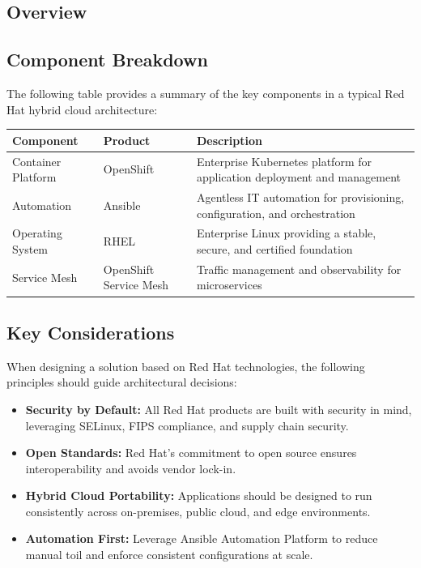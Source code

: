 \documentclass[11pt,a4paper]{article}
\begin{document}
\subsection{Overview}

\lipsum[1]

\subsection{Component Breakdown}

The following table provides a summary of the key components in a typical Red Hat hybrid cloud architecture:

\begin{center}
\begin{tabularx}{\textwidth}{llX}
    \toprule
    \textbf{Component} & \textbf{Product} & \textbf{Description} \\
    \midrule
    Container Platform & OpenShift & Enterprise Kubernetes platform for application deployment and management \\
    Automation         & Ansible   & Agentless IT automation for provisioning, configuration, and orchestration \\
    Operating System   & RHEL      & Enterprise Linux providing a stable, secure, and certified foundation \\
    Service Mesh       & OpenShift Service Mesh & Traffic management and observability for microservices \\
    \bottomrule
\end{tabularx}
\end{center}

\subsection{Key Considerations}

When designing a solution based on Red Hat technologies, the following principles should guide architectural decisions:

\begin{itemize}
    \item \textbf{Security by Default:} All Red Hat products are built with security in mind, leveraging SELinux, FIPS compliance, and supply chain security.
    \item \textbf{Open Standards:} Red Hat's commitment to open source ensures interoperability and avoids vendor lock-in.
    \item \textbf{Hybrid Cloud Portability:} Applications should be designed to run consistently across on-premises, public cloud, and edge environments.
    \item \textbf{Automation First:} Leverage Ansible Automation Platform to reduce manual toil and enforce consistent configurations at scale.
\end{itemize}
\end{document}
